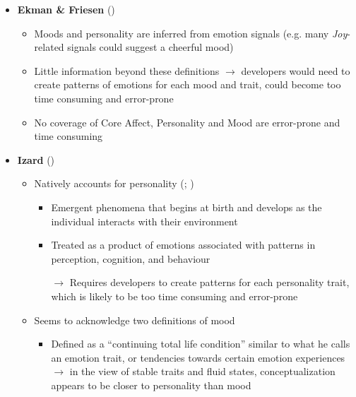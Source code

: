 \begin{itemize}
    \item \textbf{Ekman \& Friesen} (\weak)
    \begin{itemize}
        \item Moods and personality are inferred from emotion
        signals (e.g. many \textit{Joy}-related signals could suggest a
        cheerful mood)~\citep[p.~48, 55--56]{ekman1999basic}

        \item Little information beyond these definitions $\rightarrow$
        developers would need to create patterns of emotions for each mood and
        trait, could become too time consuming and error-prone

        \item No coverage of Core Affect, Personality and Mood are error-prone
        and time consuming
    \end{itemize}

    \item \textbf{Izard} (\weak)
    \begin{itemize}
        \item Natively accounts for personality
        (; )
        \begin{itemize}
            \item Emergent phenomena that begins at birth and develops as the
            individual interacts with their environment

            \item Treated as a product of emotions associated with patterns in
            perception, cognition, and behaviour

            \item [$\rightarrow$] Requires developers to create patterns for
            each personality trait, which is likely to be too time consuming
            and error-prone
        \end{itemize}

        \item Seems to acknowledge two definitions of mood
        \begin{itemize}
            \item Defined as a ``continuing total life condition'' similar to
            what he calls an emotion trait, or tendencies towards certain
            emotion experiences~\citep[p.~17, 171]{izard1991psychology}
            $\rightarrow$ in the view of stable traits and fluid states,
            conceptualization appears to be closer to personality than mood


\end{itemize}
\end{itemize}
\end{itemize}
